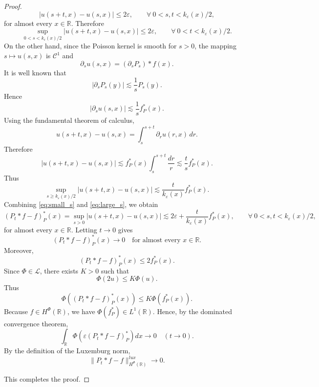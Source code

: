 \documentclass[10pt,a4paper]{amsart}
\begin{document}
\begin{proof}
\[
|u(s+t,x)-u(s,x)|
\le
2\varepsilon,
\qquad \forall~ 0<s,t<k_{\varepsilon}(x)/2,
\]
for almost every $x\in\mathbb R$. Therefore
\begin{equation}\label{eq:small_s}
\sup_{0<s<k_\varepsilon(x)/2}
|u(s+t,x)-u(s,x)|
\le
2\varepsilon,
\qquad \forall~ 0<t<k_\varepsilon(x)/2 .
\end{equation}
On the other hand, since the Poisson kernel is smooth for $s>0$, the mapping
$s\mapsto u(s,x)$ is $\mathscr C^1$ and
\[
\partial_s u(s,x)
=
(\partial_s P_s)*f(x).
\]
It is well known that
\[
|\partial_s P_s(y)|
\lesssim
\frac1s P_s(y).
\]
Hence
\[
|\partial_s u(s,x)|
\lesssim
\frac1s f_P^*(x).
\]
Using the fundamental theorem of calculus,
\[
u(s+t,x)-u(s,x)
=
\int_s^{s+t}\partial_r u(r,x)\,dr.
\]
Therefore
\[
|u(s+t,x)-u(s,x)|
\lesssim
f_P^*(x)\int_s^{s+t}\frac{dr}{r}
\lesssim
\frac{t}{s}f_P^*(x).
\]
Thus
\begin{equation}\label{eq:large_s}
\sup_{s\ge k_\varepsilon(x)/2}
|u(s+t,x)-u(s,x)|
\lesssim
\frac{t}{k_\varepsilon(x)}f_P^*(x).
\end{equation}
Combining \eqref{eq:small_s} and \eqref{eq:large_s}, we obtain
\[
(P_t*f-f)_P^*(x)
=
\sup_{s>0}|u(s+t,x)-u(s,x)|
\lesssim
2\varepsilon
+
\frac{t}{k_\varepsilon(x)}f_P^*(x), 
\qquad \forall~ 0<s,t<k_{\varepsilon}(x)/2,
\]
for almost every $x\in\mathbb R$. Letting $t\to 0$ gives
\[
(P_t*f-f)_P^*(x)\longrightarrow0
\quad \text{for almost every } x\in\mathbb R .
\]
Moreover,
\[
(P_t*f-f)_P^*(x)
\le
2f_P^*(x).
\]
Since $\Phi\in\mathscr L$, there exists $K>0$ such that
\[
\Phi(2u)\le K\Phi(u).
\]
Thus
\[
\Phi((P_t*f-f)_P^*(x))
\le
K\Phi(f_P^*(x)).
\]
Because $f\in H^\Phi(\mathbb R)$, we have
$\Phi(f_P^*)\in L^1(\mathbb R)$.
Hence, by the dominated convergence theorem,
\[
\int_{\mathbb R}
\Phi\!\left(\varepsilon (P_t*f-f)_P^*\right)dx
\longrightarrow0
\quad (t\to0).
\]
By the definition of the Luxemburg norm,
\[
\|P_t*f-f\|_{H^\Phi(\mathbb R)}^{lux}
\longrightarrow0 .
\]

This completes the proof.
\end{proof}
\end{document}
